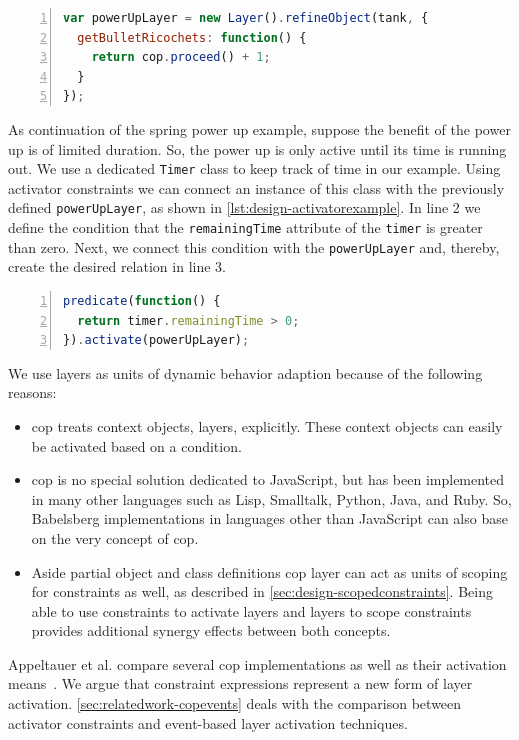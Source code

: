 \begin{lstlisting}[label=lst:design-coplayerexample,caption={Constructing a \gls{cop} layer with partial behavior},float,numbers=left,language=JavaScript,morekeywords={always}]
var powerUpLayer = new Layer().refineObject(tank, {
  getBulletRicochets: function() {
    return cop.proceed() + 1;
  }
});
\end{lstlisting}

As continuation of the spring power up example, suppose the benefit of the power up is of limited duration. So, the power up is only active until its time is running out. We use a dedicated \texttt{Timer} class to keep track of time in our example. Using activator constraints we can connect an instance of this class with the previously defined \texttt{powerUpLayer}, as shown in \autoref{lst:design-activatorexample}. In line 2 we define the condition that the \texttt{remainingTime} attribute of the \texttt{timer} is greater than zero. Next, we connect this condition with the \texttt{powerUpLayer} and, thereby, create the desired relation in line 3.

\begin{lstlisting}[label=lst:design-activatorexample,caption={Activator constraint to activate a power up for a specific amount of time},float,numbers=left,language=JavaScript,morekeywords={always}]
predicate(function() {
  return timer.remainingTime > 0;
}).activate(powerUpLayer);
\end{lstlisting}

We use layers as units of dynamic behavior adaption because of the following reasons:
\begin{itemize}
\item \gls{cop} treats context objects, layers, explicitly.
These context objects can easily be activated based on a condition. \item \gls{cop} is no special solution dedicated to JavaScript, but has been implemented in many other languages such as Lisp, Smalltalk, Python, Java, and Ruby. So, Babelsberg implementations in languages other than JavaScript can also base on the very concept of \gls{cop}.
\item Aside partial object and class definitions \gls{cop} layer can act as units of scoping for constraints as well, as described in \autoref{sec:design-scopedconstraints}. Being able to use constraints to activate layers and layers to scope constraints provides additional synergy effects between both concepts.
\end{itemize}
Appeltauer et al. compare several \gls{cop} implementations as well as their activation means~\cite{Appeltauer:2009:comparison}. We argue that constraint expressions represent a new form of layer activation.
\autoref{sec:relatedwork-copevents} deals with the comparison between activator constraints and event-based layer activation techniques.


